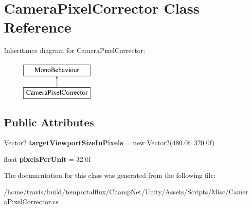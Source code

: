 \hypertarget{class_camera_pixel_corrector}{\section{Camera\-Pixel\-Corrector Class Reference}
\label{class_camera_pixel_corrector}
}
Inheritance diagram for Camera\-Pixel\-Corrector\-:\begin{figure}[H]
\begin{center}
\leavevmode
\includegraphics[height=2.000000cm]{class_camera_pixel_corrector}
\end{center}
\end{figure}
\subsection*{Public Attributes}
\begin{DoxyCompactItemize}
\item 
\hypertarget{class_camera_pixel_corrector_ad48b4a5ff5d5b30e16b7369c8d0dcdf1}{Vector2 {\bfseries target\-Viewport\-Size\-In\-Pixels} = new Vector2(480.\-0f, 320.\-0f)}\label{class_camera_pixel_corrector_ad48b4a5ff5d5b30e16b7369c8d0dcdf1}

\item 
\hypertarget{class_camera_pixel_corrector_aad6aeb12230c1e6365ff40fbccdc8029}{float {\bfseries pixels\-Per\-Unit} = 32.\-0f}\label{class_camera_pixel_corrector_aad6aeb12230c1e6365ff40fbccdc8029}

\end{DoxyCompactItemize}


The documentation for this class was generated from the following file\-:\begin{DoxyCompactItemize}
\item 
/home/travis/build/temportalflux/\-Champ\-Net/\-Unity/\-Assets/\-Scripts/\-Misc/Camera\-Pixel\-Corrector.\-cs\end{DoxyCompactItemize}
